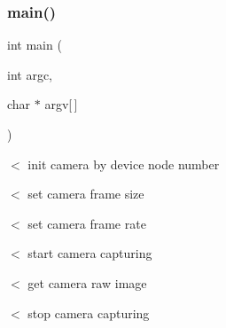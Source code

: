 \subsubsection{main()}
{\footnotesize\ttfamily int main (\begin{DoxyParamCaption}\item[{int}]{argc,  }\item[{char $\ast$}]{argv[$\,$] }\end{DoxyParamCaption})}

$<$ init camera by device node number

$<$ set camera frame size

$<$ set camera frame rate

$<$ start camera capturing

$<$ get camera raw image

$<$ stop camera capturing 